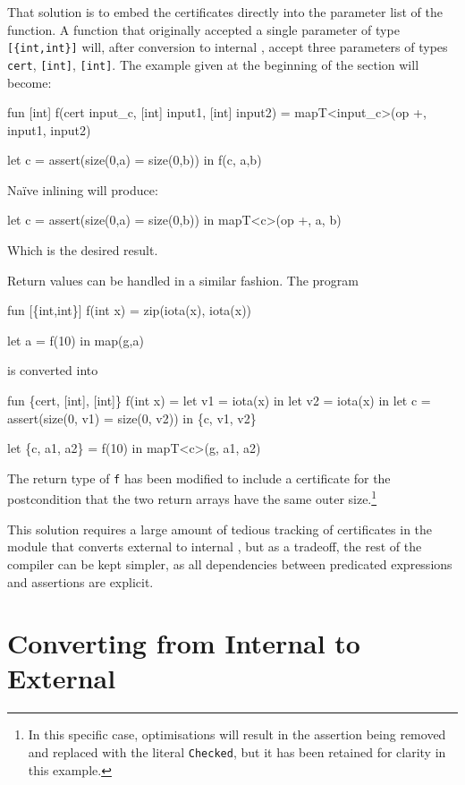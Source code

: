 That solution is to embed the certificates directly into the parameter
list of the function.  A function that originally accepted a single
parameter of type \texttt{[\{int,int\}]} will, after conversion to
internal \LO{}, accept three parameters of types \texttt{cert},
\texttt{[int]}, \texttt{[int]}.  The example given at the beginning of
the section will become:
\begin{colorcode}
fun [int] f(cert input_c, [int] input1, [int] input2) =
  mapT<input_c>(op +, input1, input2)

let c = assert(size(0,a) = size(0,b)) in
f(c, a,b)
\end{colorcode}
Naïve inlining will produce:
\begin{colorcode}
let c = assert(size(0,a) = size(0,b)) in
mapT<c>(op +, a, b)
\end{colorcode}
Which is the desired result.

Return values can be handled in a similar fashion.  The program
\begin{colorcode}
fun [\{int,int\}] f(int x) =
    zip(iota(x), iota(x))

let a = f(10) in
map(g,a)
\end{colorcode}
is converted into
\begin{colorcode}
fun \{cert, [int], [int]\} f(int x) =
  let v1 = iota(x) in
  let v2 = iota(x) in
  let c = assert(size(0, v1) = size(0, v2)) in
  \{c, v1, v2\}

let \{c, a1, a2\} = f(10) in
mapT<c>(g, a1, a2)
\end{colorcode}

The return type of \texttt{f} has been modified to include a
certificate for the postcondition that the two return arrays have the
same outer size.\footnote{In this specific case, optimisations will
  result in the assertion being removed and replaced with the literal
  \texttt{Checked}, but it has been retained for clarity in this
  example.}

This solution requires a large amount of tedious tracking of
certificates in the module that converts external to internal \LO{},
but as a tradeoff, the rest of the compiler can be kept simpler, as
all dependencies between predicated expressions and assertions are
explicit.

\section{Converting from Internal to External}
\label{sec:internal-to-external}

